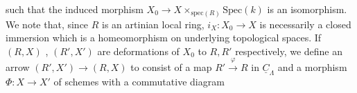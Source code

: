 such that the induced morphism $X_0 \to X \times_{\mathrm{spec}(R)} \mathrm{Spec}(k)$ is an isomorphism. We note that, since $R$ is an artinian local ring, $i_X : X_0 \to X$ is necessarily a closed immersion which is a homeomorphism on underlying topological spaces. If $(R, X)$ , $(R', X')$ are deformations of $X_0$ to $R, R'$ respectively, we define an arrow $(R', X') \to (R, X)$ to consist of a map $R' \xrightarrow{\ \varphi\ } R$ in $\underline{C}_\Lambda$ and a morphism $\Phi : X \to X'$ of schemes with a commutative diagram

